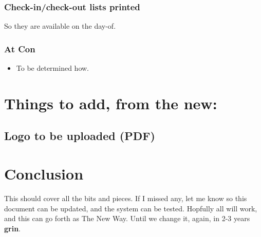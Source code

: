 \documentclass[captions=tablesignature]{scrartcl}
\begin{document}
\subsubsection{Check-in/check-out lists printed}
\label{sec-3-2-21}
So they are available on the day-of.

\subsubsection{At Con}
\label{sec-3-2-22}
\begin{itemize}
\item To be determined how.
\end{itemize}

\section{Things to add, from the new:}
\label{sec-4}
\subsection{Logo to be uploaded (PDF)}
\label{sec-4-1}

\section{Conclusion}
\label{sec-5}
This should cover all the bits and pieces.  If I missed any, let me
know so this document can be updated, and the system can be tested.
Hopfully all will work, and this can go forth as The New Way.  Until
we change it, again, in 2-3 years \textbf{grin}.
\end{document}
